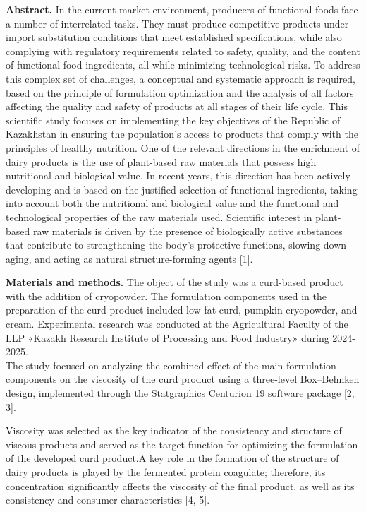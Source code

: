 \begin{multicols}{2}
{\bfseries Abstract.} In the current market environment, producers of
functional foods face a number of interrelated tasks. They must produce
competitive products under import substitution conditions that meet
established specifications, while also complying with regulatory
requirements related to safety, quality, and the content of functional
food ingredients, all while minimizing technological risks. To address
this complex set of challenges, a conceptual and systematic approach is
required, based on the principle of formulation optimization and the
analysis of all factors affecting the quality and safety of products at
all stages of their life cycle. This scientific study focuses on
implementing the key objectives of the Republic of Kazakhstan in
ensuring the population's access to products that comply with the
principles of healthy nutrition. One of the relevant directions in the
enrichment of dairy products is the use of plant-based raw materials
that possess high nutritional and biological value. In recent years,
this direction has been actively developing and is based on the
justified selection of functional ingredients, taking into account both
the nutritional and biological value and the functional and
technological properties of the raw materials used. Scientific interest
in plant-based raw materials is driven by the presence of biologically
active substances that contribute to strengthening the body's protective
functions, slowing down aging, and acting as natural structure-forming
agents {[}1{]}.

{\bfseries Materials and methods.} The object of the study was a curd-based
product with the addition of cryopowder. The formulation components used
in the preparation of the curd product included low-fat curd, pumpkin
cryopowder, and cream. Experimental research was conducted at the
Agricultural Faculty of the LLP «Kazakh Research Institute of Processing
and Food Industry» during 2024-2025.\\
The study focused on analyzing the combined effect of the main
formulation components on the viscosity of the curd product using a
three-level Box--Behnken design, implemented through the Statgraphics
Centurion 19 software package {[}2, 3{]}.

Viscosity was selected as the key indicator of the consistency and
structure of viscous products and served as the target function for
optimizing the formulation of the developed curd product.A key role in
the formation of the structure of dairy products is played by the
fermented protein coagulate; therefore, its concentration significantly
affects the viscosity of the final product, as well as its consistency
and consumer characteristics {[}4, 5{]}.


\end{multicols}
